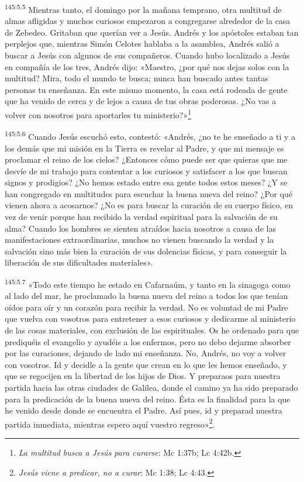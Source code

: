 \par
\textsuperscript{145:5.5} Mientras tanto, el domingo por la mañana temprano, otra multitud de almas afligidas y muchos curiosos empezaron a congregarse alrededor de la casa de Zebedeo. Gritaban que querían ver a Jesús. Andrés y los apóstoles estaban tan perplejos que, mientras Simón Celotes hablaba a la asamblea, Andrés salió a buscar a Jesús con algunos de sus compañeros. Cuando hubo localizado a Jesús en compañía de los tres, Andrés dijo: «Maestro, ¿por qué nos dejas solos con la multitud? Mira, todo el mundo te busca; nunca han buscado antes tantas personas tu enseñanza. En este mismo momento, la casa está rodeada de gente que ha venido de cerca y de lejos a causa de tus obras poderosas. ¿No vas a volver con nosotros para aportarles tu ministerio?»\footnote{\textit{La multitud busca a Jesús para curarse}: Mc 1:37b; Lc 4:42b.}

\par
\textsuperscript{145:5.6} Cuando Jesús escuchó esto, contestó: «Andrés, ¿no te he enseñado a ti y a los demás que mi misión en la Tierra es revelar al Padre, y que mi mensaje es proclamar el reino de los cielos? ¿Entonces cómo puede ser que quieras que me desvíe de mi trabajo para contentar a los curiosos y satisfacer a los que buscan signos y prodigios? ¿No hemos estado entre esa gente todos estos meses? ¿Y se han congregado en multitudes para escuchar la buena nueva del reino? ¿Por qué vienen ahora a acosarnos? ¿No es para buscar la curación de su cuerpo físico, en vez de venir porque han recibido la verdad espiritual para la salvación de su alma? Cuando los hombres se sienten atraídos hacia nosotros a causa de las manifestaciones extraordinarias, muchos no vienen buscando la verdad y la salvación sino más bien la curación de sus dolencias físicas, y para conseguir la liberación de sus dificultades materiales».

\par
\textsuperscript{145:5.7} «Todo este tiempo he estado en Cafarnaúm, y tanto en la sinagoga como al lado del mar, he proclamado la buena nueva del reino a todos los que tenían oídos para oír y un corazón para recibir la verdad. No es voluntad de mi Padre que vuelva con vosotros para entretener a esos curiosos y dedicarme al ministerio de las cosas materiales, con exclusión de las espirituales. Os he ordenado para que prediquéis el evangelio y ayudéis a los enfermos, pero no debo dejarme absorber por las curaciones, dejando de lado mi enseñanza. No, Andrés, no voy a volver con vosotros. Id y decidle a la gente que crean en lo que les hemos enseñado, y que se regocijen en la libertad de los hijos de Dios. Y preparaos para nuestra partida hacia las otras ciudades de Galilea, donde el camino ya ha sido preparado para la predicación de la buena nueva del reino. Ésta es la finalidad para la que he venido desde donde se encuentra el Padre. Así pues, id y preparad nuestra partida inmediata, mientras espero aquí vuestro regreso»\footnote{\textit{Jesús viene a predicar, no a curar}: Mc 1:38; Lc 4:43.}.

